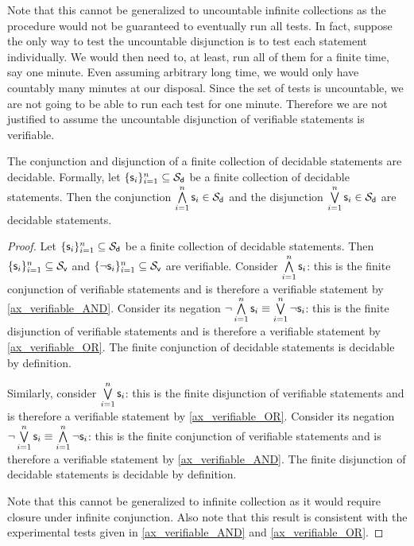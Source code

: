 \documentclass[11pt,letterpaper,fleqn]{memoir} %
\begin{document}
\begin{mathSection}
\begin{justification}
		Note that this cannot be generalized to uncountable infinite collections as the procedure would not be guaranteed to eventually run all tests. In fact, suppose the only way to test the uncountable disjunction is to test each statement individually. We would then need to, at least, run all of them for a finite time, say one minute. Even assuming arbitrary long time, we would only have countably many minutes at our disposal. Since the set of tests is uncountable, we are not going to be able to run each test for one minute. Therefore we are not justified to assume the uncountable disjunction of verifiable statements is verifiable.
	\end{justification}
	\begin{prop}\label{prop_decidable_AND_OR}
		The conjunction and disjunction of a finite collection of decidable statements are decidable. Formally, let $\{\mathsf{s}_i\}_{i=1}^{n} \subseteq \mathcal{S}_\textsf{d}$ be a finite collection of decidable statements. Then the conjunction $\bigwedge\limits_{i=1}^{n} \mathsf{s}_i \in \mathcal{S}_\textsf{d}$ and the disjunction $\bigvee\limits_{i=1}^{n} \mathsf{s}_i \in \mathcal{S}_\textsf{d}$ are decidable statements.
	\end{prop}
\begin{proof}
	Let $\{\mathsf{s}_i\}_{i=1}^{n} \subseteq \mathcal{S}_\textsf{d}$ be a finite collection of decidable statements. Then $\{\mathsf{s}_i\}_{i=1}^{n} \subseteq \mathcal{S}_\textsf{v}$ and $\{\neg\mathsf{s}_i\}_{i=1}^{n} \subseteq \mathcal{S}_\textsf{v}$ are verifiable. Consider $\bigwedge\limits_{i=1}^{n} \mathsf{s}_i$: this is the finite conjunction of verifiable statements and is therefore a verifiable statement by \ref{ax_verifiable_AND}. Consider its negation $\neg \bigwedge\limits_{i=1}^{n} \mathsf{s}_i \equiv \bigvee\limits_{i=1}^{n} \neg \mathsf{s}_i$: this is the finite disjunction of verifiable statements and is therefore a verifiable statement by \ref{ax_verifiable_OR}. The finite conjunction of decidable statements is decidable by definition.
	
	Similarly, consider $\bigvee\limits_{i=1}^{n} \mathsf{s}_i$: this is the finite disjunction of verifiable statements and is therefore a verifiable statement by \ref{ax_verifiable_OR}. Consider its negation $\neg \bigvee\limits_{i=1}^{n} \mathsf{s}_i \equiv \bigwedge\limits_{i=1}^{n} \neg \mathsf{s}_i$: this is the finite conjunction of verifiable statements and is therefore a verifiable statement by \ref{ax_verifiable_AND}. The finite disjunction of decidable statements is decidable by definition.
	
	Note that this cannot be generalized to infinite collection as it would require closure under infinite conjunction. Also note that this result is consistent with the experimental tests given in \ref{ax_verifiable_AND} and \ref{ax_verifiable_OR}.
\end{proof}
\end{mathSection}
\end{document}
